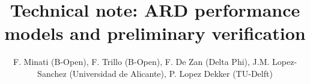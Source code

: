 \documentclass[deltaphi]{deltaphi-report}
\title{Technical note: ARD performance models and preliminary verification}
\author{F. Minati (B-Open), F. Trillo (B-Open), F. De Zan (Delta Phi), J.M. Lopez-Sanchez (Universidad de Alicante), P. Lopez Dekker (TU-Delft)}
\newcommand{\EnableFootNotes}{%
  \LetLtxMacro\footnote\Oldfootnote%
}
\newcommand{\DisableFootNotes}{%
  \renewcommand{\footnote}[2][]{\relax}
}
\begin{document}
\maketitle
\makelog

\tableofcontents

%
\printacronyms
\clearpage

%
\clearpage
%
%
\clearpage
%
%
\end{document}
